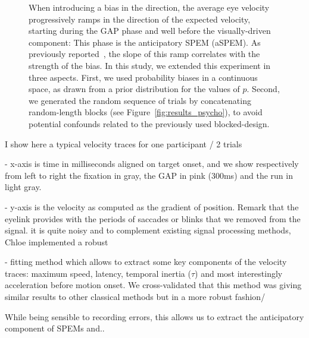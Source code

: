 \documentclass[12pt,english]{article}%
\newcommand{\citep}[1]{\parencite{#1}}
\newcommand{\seeFig}[1]{Figure~\ref{fig:#1}}
\begin{document}
\begin{figure}
{When introducing a bias in the direction,
the average eye velocity progressively ramps
in the direction of the expected velocity, starting during the GAP phase and well before the visually-driven component:
This phase is the anticipatory SPEM (aSPEM).
As previously reported~\citep{Montagnini2010, SantosKowler2017,Damasse18},
the slope of this ramp correlates with the strength of the bias.
In this study, we extended this experiment in three aspects.
First, we used probability biases in a continuous space,
as drawn from a prior distribution for the values of $p$.
Second, we generated the random sequence of trials
by concatenating random-length blocks (see \seeFig{results_psycho}),
to avoid potential confounds related to the previously used blocked-design.
}
\label{fig:introB}
\end{figure}


I show here a typical velocity traces for one participant / 2 trials

- x-axis is time in milliseconds aligned on target onset,
and we show respectively from left to right the fixation in gray,
the GAP in pink (300ms) and the run in light gray.

- y-axis is the velocity as computed as the gradient of position.
Remark that the eyelink provides with the periods of saccades or
 blinks that we removed from the signal. it is quite noisy and
 to complement existing signal processing methods,
 Chloe implemented a robust

- fitting method which allows to extract some key components of
the velocity traces: maximum speed, latency, temporal inertia ($\tau$)
 and most interestingly acceleration before motion onset.
 We cross-validated that this method was giving similar results
  to other classical methods but in a more robust fashion/

While being sensible to recording errors, this allows us to extract the
 anticipatory component of SPEMs and..

\end{document}
